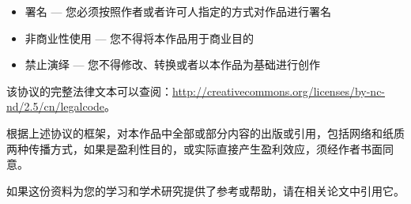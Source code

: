 \begin{itemize}
  \item 署名 — 您必须按照作者或者许可人指定的方式对作品进行署名
  \item 非商业性使用 — 您不得将本作品用于商业目的
  \item 禁止演绎 — 您不得修改、转换或者以本作品为基础进行创作
\end{itemize}

该协议的完整法律文本可以查阅：\url{http://creativecommons.org/licenses/by-nc-nd/2.5/cn/legalcode}。

根据上述协议的框架，对本作品中全部或部分内容的出版或引用，包括网络和纸质两种传播方式，如果是盈利性目的，或实际直接产生盈利效应，须经作者书面同意。

如果这份资料为您的学习和学术研究提供了参考或帮助，请在相关论文中引用它。

